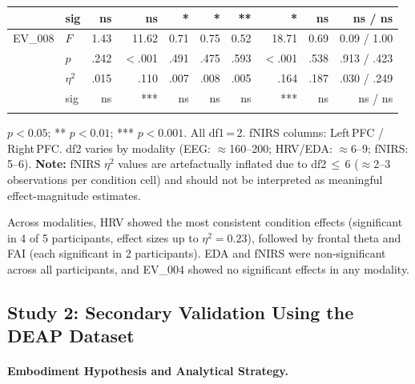 \begin{table}[htbp]
\begin{tabular}{llrrrrrrrr}
               & sig & ns & ns & * & * & ** & * & ns & ns / ns \\
        \hline
        EV\_008 & $F$ & 1.43 & 11.62 & 0.71 & 0.75 & 0.52 & 18.71 & 0.69 & 0.09 / 1.00 \\
               & $p$ & .242 & $<$.001 & .491 & .475 & .593 & $<$.001 & .538 & .913 / .423 \\
               & $\eta^2$ & .015 & .110 & .007 & .008 & .005 & .164 & .187 & .030 / .249 \\
               & sig & ns & *** & ns & ns & ns & *** & ns & ns / ns \\
        \hline
        \multicolumn{10}{l}{\rule{0pt}{8pt}} \\[-6pt]
        \hline
    \end{tabular}
    \par\vspace{4pt}
    \noindent\parbox{\linewidth}{\scriptsize * $p < 0.05$; ** $p < 0.01$; *** $p < 0.001$. All df1\,=\,2. fNIRS columns: Left\,PFC / Right\,PFC. df2 varies by modality (EEG: $\approx$160--200; HRV/EDA: $\approx$6--9; fNIRS: 5--6). \textbf{Note:} fNIRS $\eta^2$ values are artefactually inflated due to df2\,$\leq$\,6 ($\approx$2--3 observations per condition cell) and should not be interpreted as meaningful effect-magnitude estimates.}
\end{table}

\noindent Across modalities, \gls{HRV} showed the most consistent condition effects (significant in 4 of 5 participants, effect sizes up to $\eta^2 = 0.23$), followed by frontal theta and \gls{FAI} (each significant in 2 participants). \gls{EDA} and \gls{fNIRS} were non-significant across all participants, and EV\_004 showed no significant effects in any modality.

\vspace{1em}

\subsection{Study 2: Secondary Validation Using the DEAP Dataset}
\label{sec:results_ev2}

\paragraph{Embodiment Hypothesis and Analytical Strategy.}

